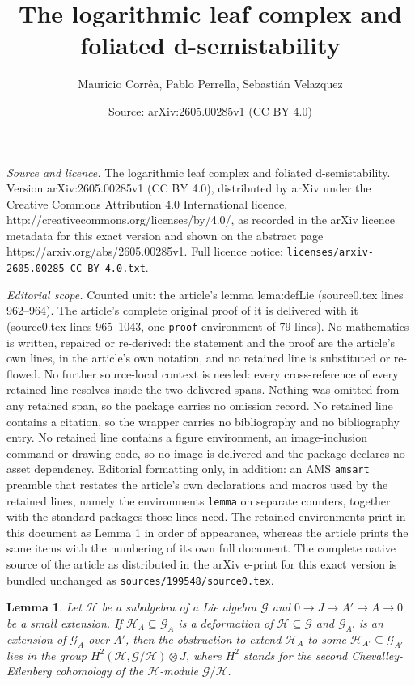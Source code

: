 \documentclass[10pt,a4paper]{amsart}
\title{The logarithmic leaf complex and foliated d-semistability}
\author{Mauricio Corr\^ea, Pablo Perrella, Sebasti\'an Velazquez}
\date{Source: arXiv:2605.00285v1 (CC BY 4.0)}
\newtheorem{lemma}{Lemma}
\begin{document}
\maketitle

\noindent\emph{Source and licence.} The logarithmic leaf complex and foliated d-semistability. Version arXiv:2605.00285v1 (CC BY 4.0), distributed by arXiv under the Creative Commons Attribution 4.0 International licence, http://creativecommons.org/licenses/by/4.0/, as recorded in the arXiv licence metadata for this exact version and shown on the abstract page https://arxiv.org/abs/2605.00285v1. Full licence notice: \texttt{licenses/arxiv-2605.00285-CC-BY-4.0.txt}.\par\smallskip

\noindent\textit{Editorial scope.} Counted unit: the article's lemma lema:defLie (source0.tex lines 962--964). The article's complete original proof of it is delivered with it (source0.tex lines 965--1043, one \texttt{proof} environment of 79 lines). No mathematics is written, repaired or re-derived: the statement and the proof are the article's own lines, in the article's own notation, and no retained line is substituted or re-flowed.  No further source-local context is needed: every cross-reference of every retained line resolves inside the two delivered spans.  Nothing was omitted from any retained span, so the package carries no omission record.  No retained line contains a citation, so the wrapper carries no bibliography and no bibliography entry.  No retained line contains a figure environment, an image-inclusion command or drawing code, so no image is delivered and the package declares no asset dependency.  Editorial formatting only, in addition: an AMS \texttt{amsart} preamble that restates the article's own declarations and macros used by the retained lines, namely the environments \texttt{lemma} on separate counters, together with the standard packages those lines need.  The retained environments print in this document as Lemma 1 in order of appearance, whereas the article prints the same items with the numbering of its own full document.  The complete native source of the article as distributed in the arXiv e-print for this exact version is bundled unchanged as \texttt{sources/199548/source0.tex}.
\begin{lemma}
\label{lema:defLie}    Let $\mathcal H$ be a subalgebra of a Lie algebra $\mathcal G$ and $0\to J\to A'\to A\to 0$ be a small extension. If $\mathcal{H}_A\subseteq \mathcal G_A$ is a deformation of $\mathcal H\subseteq \mathcal G$ and $\mathcal G_{A'}$ is an extension of $\mathcal G_A$ over $A'$, then the obstruction to extend $\mathcal H_A$ to some $\mathcal H_{A'}\subseteq \mathcal G_{A'}$ lies in the group $H^2(\mathcal H,\mathcal G/\mathcal H)\otimes J$, where $H^2$ stands for the second Chevalley-Eilenberg cohomology of the $\mathcal H$-module $\mathcal{G}/\mathcal H$.
\end{lemma}
\end{document}
